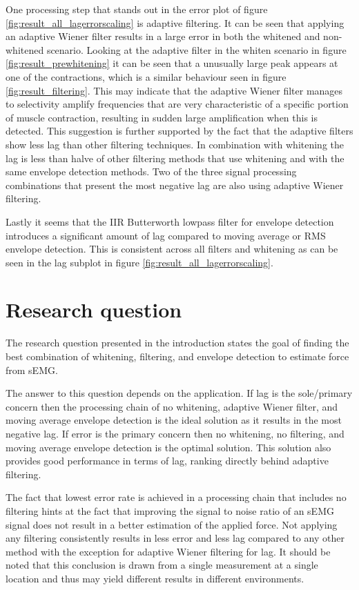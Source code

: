 One processing step that stands out in the error plot of figure \ref{fig:result_all_lagerrorscaling} is adaptive filtering. It can be seen that applying an adaptive Wiener filter results in a large error in both the whitened and non-whitened scenario. Looking at the adaptive filter in the whiten scenario in figure \ref{fig:result_prewhitening} it can be seen that a unusually large peak appears at one of the contractions, which is a similar behaviour seen in figure \ref{fig:result_filtering}. This may indicate that the adaptive Wiener filter manages to selectivity amplify frequencies that are very characteristic of a specific portion of muscle contraction, resulting in sudden large amplification when this is detected. This suggestion is further supported by the fact that the adaptive filters show less lag than other filtering techniques. In combination with whitening the lag is less than halve of other filtering methods that use whitening and with the same envelope detection methods. Two of the three signal processing combinations that present the most negative lag are also using adaptive Wiener filtering.

Lastly it seems that the IIR Butterworth lowpass filter for envelope detection introduces a significant amount of lag compared to moving average or RMS envelope detection. This is consistent across all filters and whitening as can be seen in the lag subplot in figure \ref{fig:result_all_lagerrorscaling}.

\section{Research question}
The research question presented in the introduction states the goal of finding the best combination of whitening, filtering, and envelope detection to estimate force from sEMG. 

The answer to this question depends on the application. If lag is the sole/primary concern then the processing chain of no whitening, adaptive Wiener filter, and moving average envelope detection is the ideal solution as it results in the most negative lag. If error is the primary concern then no whitening, no filtering, and moving average envelope detection is the optimal solution. This solution also provides good performance in terms of lag, ranking directly behind adaptive filtering.

The fact that lowest error rate is achieved in a processing chain that includes no filtering hints at the fact that improving the signal to noise ratio of an sEMG signal does not result in a better estimation of the applied force. Not applying any filtering consistently results in less error and less lag compared to any other method with the exception for adaptive Wiener filtering for lag. It should be noted that this conclusion is drawn from a single measurement at a single location and thus may yield different results in different environments. 

